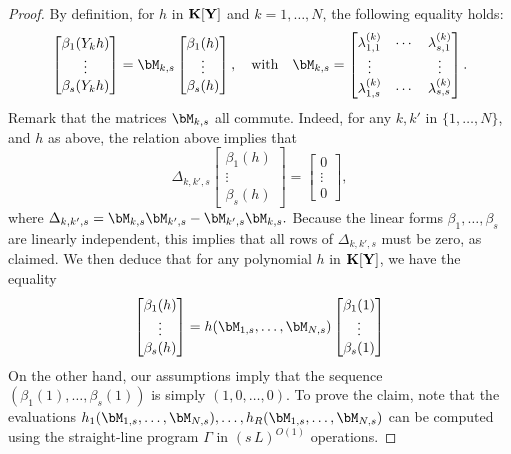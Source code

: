 \documentclass[12pt]{article}
\begin{document}
\begin{proof}
  By definition, for $h$ in $\mathbf{K}[\mathbf{Y}]$ and $k=1,\dots,N$, the following equality
  holds:
$$
  \begin{bmatrix}
    \beta_1(Y_k h)\\
    \vdots\\
    \beta_s(Y_k h)
  \end{bmatrix}=
\bM_{k,s}
  \begin{bmatrix}
    \beta_1(h)\\
    \vdots\\
    \beta_s(h)
  \end{bmatrix},
\quad\text{with}\quad
\bM_{k,s}= \begin{bmatrix}
    \lambda^{(k)}_{1,1} & \cdots & \lambda^{(k)}_{s,1}\\
    \vdots && \vdots \\
    \lambda^{(k)}_{1,s} & \cdots & \lambda^{(k)}_{s,s}
  \end{bmatrix}.
$$ 
 Remark that the matrices $\bM_{k,s}$ all commute. Indeed, 
for any $k,k'$ in $\{1,\dots,N\}$, and $h$ as above, the relation above implies
that 
$$
\Delta_{k,k',s}
  \begin{bmatrix}
    \beta_1(h)\\
    \vdots\\
    \beta_s(h)
  \end{bmatrix} =
  \begin{bmatrix}
0\\ \vdots \\ 0 
  \end{bmatrix},
$$
where $\Delta_{k,k',s} = \bM_{k,s}\bM_{k',s}-\bM_{k',s}\bM_{k,s}.$ Because 
the linear forms $\beta_1,\dots,\beta_s$ are linearly independent, this implies
that all rows of $\Delta_{k,k',s}$ must be zero, as claimed.
We then deduce that for any polynomial $h$ in $\mathbf{K}[\mathbf{Y}]$, we have
the equality
$$  \begin{bmatrix}
    \beta_1(h)\\
    \vdots\\
    \beta_s(h)
  \end{bmatrix} =
h(\bM_{1,s},\dots,\bM_{N,s})   \begin{bmatrix}
    \beta_1(1)\\
    \vdots\\
    \beta_s(1)
  \end{bmatrix} $$ On the other hand, our assumptions imply that the
  sequence $(\beta_1(1),\dots,\beta_s(1))$ is simply $(1,0,\dots,0)$.
  To prove the claim, note that the evaluations
  $h_1(\bM_{1,s},\dots,\bM_{N,s}),\dots,h_R(\bM_{1,s},\dots,\bM_{N,s})$
  can be computed using the straight-line program $\Gamma$ in
  $(s\,L)^{O(1)}$ operations.
\end{proof}
\end{document}
